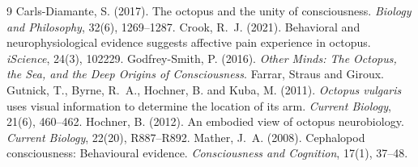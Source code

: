 \documentclass{situationist-preprint}
\begin{document}
\begin{thebibliography}{9}\small
{} Carls-Diamante, S. (2017). The octopus and the unity of consciousness. \emph{Biology and Philosophy}, 32(6), 1269--1287.
 Crook, R.~J. (2021). Behavioral and neurophysiological evidence suggests affective pain experience in octopus. \emph{iScience}, 24(3), 102229.
 Godfrey-Smith, P. (2016). \emph{Other Minds: The Octopus, the Sea, and the Deep Origins of Consciousness}. Farrar, Straus and Giroux.
 Gutnick, T., Byrne, R.~A., Hochner, B. and Kuba, M. (2011). \emph{Octopus vulgaris} uses visual information to determine the location of its arm. \emph{Current Biology}, 21(6), 460--462.
 Hochner, B. (2012). An embodied view of octopus neurobiology. \emph{Current Biology}, 22(20), R887--R892.
 Mather, J.~A. (2008). Cephalopod consciousness: Behavioural evidence. \emph{Consciousness and Cognition}, 17(1), 37--48.
\end{thebibliography}
\end{document}
